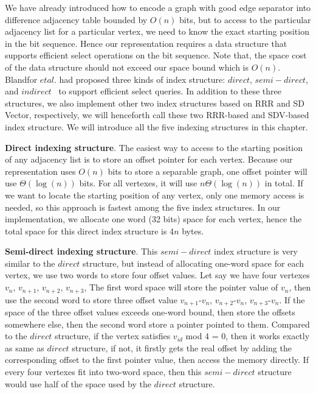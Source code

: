 \documentclass[12pt,glossary]{dalthesis}
\begin{document}
We have already introduced how to encode a graph with good edge separator into difference adjacency table bounded by $O(n)$ bits, but to access to the particular adjacency list for a particular vertex, we need to know the exact starting position in the bit sequence. Hence our representation requires a data structure that supports efficient select operations on the bit sequence. Note that, the space cost of the data structure should not exceed our space bound which is $O(n)$. Blandfor $et al.$ had proposed three kinds of index structure: $direct$, $semi-direct$, and $indirect$~\cite{compact-representation} to support efficient select queries. In addition to these three structures, we also implement other two index structures based on RRR and SD Vector, respectively, we will henceforth call these two RRR-based and SDV-based index structure. We will introduce all the five indexing structures in this chapter.

\bigskip
\bigskip

\textbf{Direct indexing structure}. The easiest way to access to the starting position of 
any adjacency list is to store an offset pointer for each vertex. Because our representation uses $O(n)$ bits to store a separable graph, one offset pointer will use $\Theta (\log (n))$ bits. For all vertexes, it will use $n \Theta (\log (n))$ in total. If we want to locate the starting position of any vertex, only one memory access is needed, so this approach is fastest among the five index structures. In our implementation, we allocate one word (32 bits) space for each vertex, hence the total space for this direct index structure is 4$n$ bytes.

\bigskip
\bigskip

\textbf{Semi-direct indexing structure}. This $semi-direct$ index structure is very similar to the $direct$ structure, but instead of allocating one-word space for each vertex, we use two words to store four offset values. Let say we have four vertexes $v_{n}$, $v_{n+1}$, $v_{n+2}$, $v_{n+3}$, The first word space will store the pointer value of $v_{n}$, then use the second word to store three offset value $v_{n+1}$-$v_{n}$, $v_{n+2}$-$v_{n}$, $v_{n+3}$-$v_{n}$. If the space of the three offset values exceeds one-word bound, then store the offsets somewhere else, then the second word store a pointer pointed to them. Compared to the $direct$ structure, if the vertex satisfies $v_{id}$ mod 4 = 0, then it works exactly as same as $direct$ structure, if not, it firstly gets the real offset by adding the corresponding offset to the first pointer value, then access the memory directly. If every four vertexes fit into two-word space, then this $semi-direct$ structure would use half of the space used by the $direct$ structure.     
\end{document}
